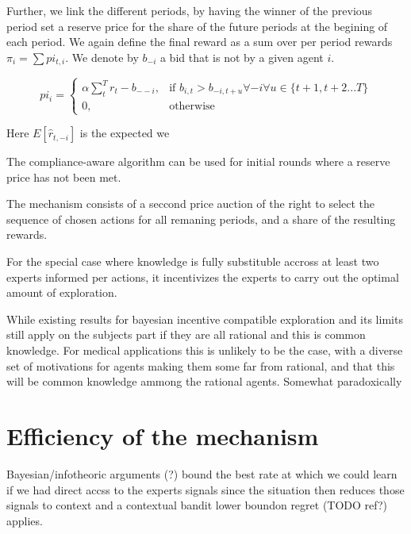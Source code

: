 Further, we link the different periods, by having the winner of the previous period set a reserve price for the share of the future periods at the begining of each period. We again define the final reward as a sum over per period rewards $\pi_i = \sum pi_{t,i}$. We denote by $b_{-i}$ a bid that is not by a given agent $i$. 

\[
pi_{i} =
\begin{cases}
    \alpha \sum_t^T r_t - b_{--i}, & \text{if } b_{i,t} > b_{-i,t+u} \forall -i \forall u \in \{t+1,t+2...T\}\\
    0,              & \text{otherwise}
\end{cases}
\]


Here $E[\hat{r}_{t,-i}]$ is the expected we


The compliance-aware algorithm can be used for initial rounds where a reserve price has not been met.



The mechanism consists of a seccond price auction of the right to select the sequence of chosen actions for all remaning periods, and a share of the resulting rewards.

For the special case where knowledge is  fully substituble accross at least two experts informed per actions, it incentivizes the experts to carry out the optimal amount of exploration. 

While existing results for bayesian incentive compatible exploration and its limits still apply on the subjects part if they are all rational and this is common knowledge. For medical applications this is unlikely to be the case, with a diverse set of motivations for agents making them some far from rational, and that this will be common knowledge ammong the rational agents. Somewhat paradoxically 






\section{Efficiency of the mechanism}



Bayesian/infotheoric arguments  (?)  bound the best rate at which we could learn if we had direct accss to the experts signals since the situation then reduces those signals to context and a contextual bandit lower boundon regret (TODO ref?) applies. 

